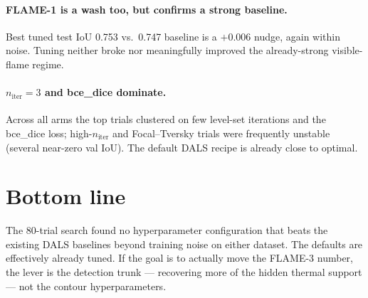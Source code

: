 \documentclass[10pt]{article}
\begin{document}
\paragraph{FLAME-1 is a wash too, but confirms a strong baseline.} Best tuned test
IoU 0.753 vs.\ 0.747 baseline is a $+0.006$ nudge, again within noise. Tuning
neither broke nor meaningfully improved the already-strong visible-flame regime.

\paragraph{$n_{\text{iter}}\!=\!3$ and bce\_dice dominate.} Across all arms the
top trials clustered on few level-set iterations and the bce\_dice loss;
high-$n_{\text{iter}}$ and Focal--Tversky trials were frequently unstable (several
near-zero val IoU). The default DALS recipe is already close to optimal.

\section{Bottom line}

The 80-trial search found no hyperparameter configuration that beats the existing
DALS baselines beyond training noise on either dataset. The defaults are
effectively already tuned. If the goal is to actually move the FLAME-3 number, the
lever is the detection trunk --- recovering more of the hidden thermal support ---
not the contour hyperparameters.
\end{document}
